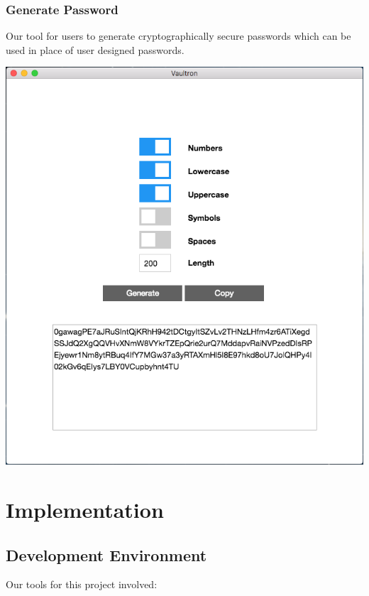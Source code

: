 \documentclass[11pt]{report}
\begin{document}
\subsection{Generate Password}
Our tool for users to generate cryptographically secure passwords which can be
used in place of user designed passwords.
\begin{center}
\includegraphics[scale=0.40]{app-passgen-demo.png}
\end{center}


\chapter{Implementation}
\section{Development Environment}

Our tools for this project involved:
\end{document}
